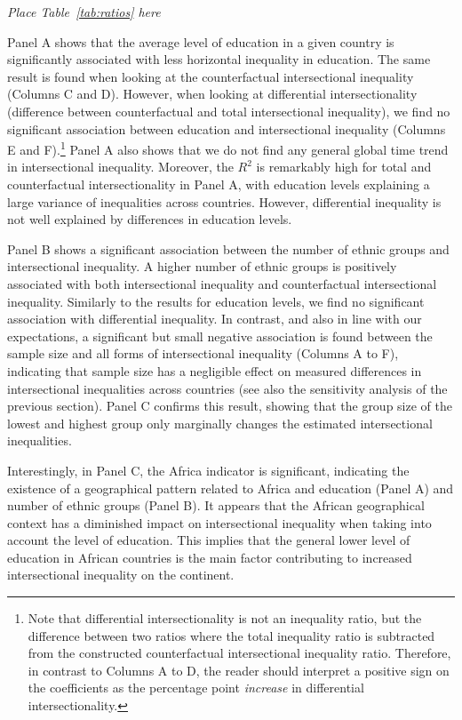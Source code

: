 \begin{center}
    \textit{Place Table~\ref{tab:ratios} here}
\end{center}

Panel A shows that the average level of education in a given country is significantly associated with less horizontal inequality in education. The same result is found when looking at the counterfactual intersectional inequality (Columns C and D). However, when looking at differential intersectionality (difference between counterfactual and total intersectional inequality), we find no significant association between education and intersectional inequality (Columns E and F).\footnote{Note that differential intersectionality is not an inequality ratio, but the difference between two ratios where the total inequality ratio is subtracted from the constructed counterfactual intersectional inequality ratio. Therefore, in contrast to Columns A to D, the reader should interpret a positive sign on the coefficients as the percentage point \textit{increase} in differential intersectionality.} Panel A also shows that we do not find any general global time trend in intersectional inequality. Moreover, the $R^2$ is remarkably high for total and counterfactual intersectionality in Panel A, with education levels explaining 
a large variance of inequalities across countries. However, differential inequality is not well explained by differences in education levels. 

Panel B shows a significant association between the number of ethnic groups and intersectional inequality. A higher number of ethnic groups is positively associated with both intersectional inequality and counterfactual intersectional inequality. Similarly to the results for education levels, we find no significant association with differential inequality. In contrast, and also in line with our expectations, a significant but small negative association is found between the sample size and all forms of intersectional inequality (Columns A to F), indicating that sample size has a negligible effect on measured differences in intersectional inequalities across countries (see also the sensitivity analysis of the previous section). Panel C confirms this result, showing that the group size of the lowest and highest group only marginally changes the estimated intersectional inequalities.

Interestingly, in Panel C, the Africa indicator is significant, indicating the existence of a geographical pattern related to Africa and education (Panel A) and number of ethnic groups (Panel B). It appears that the African geographical context has a diminished impact on intersectional inequality when taking into account the level of education. This implies that the general lower level of education in African countries is the main factor contributing to increased intersectional inequality on the continent. 

